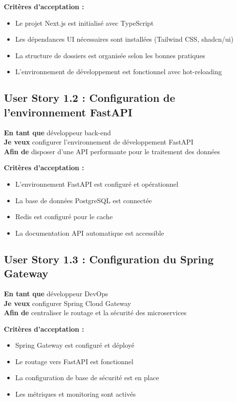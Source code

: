 \textbf{Critères d'acceptation :}
\begin{itemize}
    \item Le projet Next.js est initialisé avec TypeScript
    \item Les dépendances UI nécessaires sont installées (Tailwind CSS, shadcn/ui)
    \item La structure de dossiers est organisée selon les bonnes pratiques
    \item L'environnement de développement est fonctionnel avec hot-reloading
\end{itemize}

\subsection{User Story 1.2 : Configuration de l'environnement FastAPI}

\textbf{En tant que} développeur back-end \\
\textbf{Je veux} configurer l'environnement de développement FastAPI \\
\textbf{Afin de} disposer d'une API performante pour le traitement des données

\textbf{Critères d'acceptation :}
\begin{itemize}
    \item L'environnement FastAPI est configuré et opérationnel
    \item La base de données PostgreSQL est connectée
    \item Redis est configuré pour le cache
    \item La documentation API automatique est accessible
\end{itemize}

\subsection{User Story 1.3 : Configuration du Spring Gateway}

\textbf{En tant que} développeur DevOps \\
\textbf{Je veux} configurer Spring Cloud Gateway \\
\textbf{Afin de} centraliser le routage et la sécurité des microservices

\textbf{Critères d'acceptation :}
\begin{itemize}
    \item Spring Gateway est configuré et déployé
    \item Le routage vers FastAPI est fonctionnel
    \item La configuration de base de sécurité est en place
    \item Les métriques et monitoring sont activés
\end{itemize}

